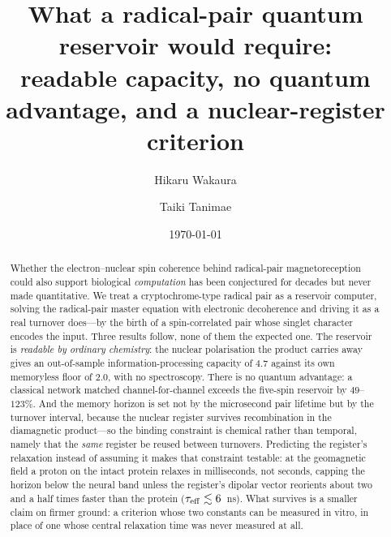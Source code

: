 \documentclass[aps,prx,reprint,superscriptaddress,nofootinbib,floatfix]{revtex4-2}
\begin{document}
\title{What a radical-pair quantum reservoir would require:\\
readable capacity, no quantum advantage, and a nuclear-register criterion}

\author{Hikaru Wakaura}
\author{Taiki Tanimae}
  
 
\date{\today}     

\begin{abstract}
Whether the electron--nuclear spin coherence behind radical-pair magnetoreception
could also support biological \emph{computation} has been conjectured for decades
but never made quantitative. We treat a cryptochrome-type radical pair as a
reservoir computer, solving the radical-pair master equation with electronic
decoherence and driving it as a real turnover does---by the birth of a
spin-correlated pair whose singlet character encodes the input. Three results
follow, none of them the expected one. The reservoir is \emph{readable by ordinary
chemistry}: the nuclear polarisation the product carries away gives an
out-of-sample information-processing capacity of $4.7$ against its own memoryless
floor of $2.0$, with no spectroscopy. There is no quantum advantage: a classical
network matched channel-for-channel exceeds the five-spin reservoir by
$49$--$123\%$. And the memory horizon is set not by the microsecond pair lifetime
but by the turnover interval, because the nuclear register survives recombination
in the diamagnetic product---so the binding constraint is chemical rather than
temporal, namely that the \emph{same} register be reused between turnovers.
Predicting the register's relaxation instead of assuming it makes that constraint
testable: at the geomagnetic field a proton on the intact protein relaxes in
milliseconds, not seconds, capping the horizon below the neural band unless the
register's dipolar vector reorients about two and a half times faster than the
protein ($\tau_{\rm eff}\lesssim6$~ns). What survives is a smaller claim on firmer
ground: a criterion whose two constants can be measured in vitro, in place of one
whose central relaxation time was never measured at all.
\end{abstract}  

\maketitle 
\end{document}

